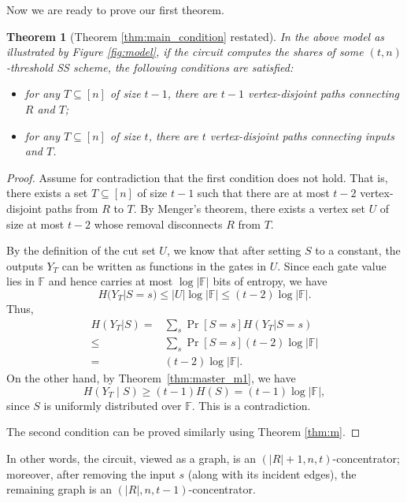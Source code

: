 \documentclass[11pt]{article}
\newtheorem{theorem}{Theorem}
\newcommand{\cond}{|}
\begin{document}
Now we are ready to prove our first theorem.

\begin{theorem} [Theorem \ref{thm:main_condition} restated]
\label{thm:graph_properties_main}
In the above model as illustrated by Figure \ref{fig:model}, if the circuit computes the shares of some $(t, n)$-threshold SS scheme, the following conditions are satisfied:
\begin{itemize}
	\item for any $T \subseteq [n]$ of size $t-1$, there are $t-1$ vertex-disjoint paths connecting $R$ and $T$;
	\item for any $T \subseteq [n]$ of size $t$, there are $t$ vertex-disjoint paths connecting inputs and $T$.
\end{itemize}
\end{theorem}
\begin{proof} 
Assume for contradiction that the first condition does not hold. That is, there exists a set $T \subseteq [n]$ of size $t-1$ such that there are at most $t-2$ vertex-disjoint paths from $R$ to $T$. By Menger's theorem, there exists a vertex set $U$ of size at most $t-2$ whose removal disconnects $R$ from $T$.

By the definition of the cut set $U$, we know that after setting $S$ to a constant, the outputs $Y_T$ can be written as functions in the gates in $U$. Since each gate value lies in $\mathbb{F}$ and hence carries at most $\log |\mathbb{F}|$ bits of entropy, we have
\[
H(Y_T \cond S = s) \le |U| \log |\mathbb{F}| \le (t-2) \log |\mathbb{F}|.
\]
Thus, 
\begin{align*}
	H(Y_T \cond S) = & \sum_s\Pr[S = s] H(Y_T \cond S = s) \\
	 \le & \sum_s\Pr[S = s] (t-2) \log |\mathbb{F}| \\
	 = & (t-2) \log |\mathbb{F}|.
\end{align*}
On the other hand, by Theorem~\ref{thm:master_m1}, we have
\[
H(Y_T \mid S) \ge (t-1) H(S) = (t-1) \log |\mathbb{F}|,
\]
since $S$ is uniformly distributed over $\mathbb{F}$. This is a contradiction.

The second condition can be proved similarly using Theorem \ref{thm:m}.
\end{proof}

In other words, the circuit, viewed as a graph, is an $(|R|+1, n, t)$-concentrator; moreover, after removing the input $s$ (along with its incident edges), the remaining graph is an $(|R|, n, t-1)$-concentrator.
\end{document}

